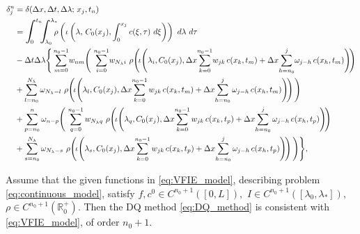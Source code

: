 \documentclass[10pt,a4paper]{amsart}
\begin{document}
\begin{equation}\label{eq:DQ_local_error}
    \allowdisplaybreaks
    \begin{split}
        \delta_j^n&=\delta(\Delta x, \Delta t, \Delta \lambda; \,  x_j,t_n) \\ 
        &=\displaystyle \scalebox{1.3}{$\displaystyle\int$}_{\!\!\!\!\! 0}^{t_n} \!\! \scalebox{1.3}{$\displaystyle\int$}_{\!\!\!\!\! \lambda_{0}}^{\lambda_{*}} \!\!\! \rho\left(\iota\left(\lambda,\, C_0(x_j), \int_0^{x_j}    c(\xi,\tau)  \ d\xi\right)\right) \ d\lambda \ d \tau \\
        &-\Delta t \Delta \lambda  \Bigg\{ \sum_{m=0}^{n_0-1} \! w_{n m} \Bigg( \, \sum_{i=0}^{n_0-1} \! w_{N_\lambda i} \ \rho \! \left( \! \iota \! \left(\lambda_i, C_0(x_j) , \Delta x \! \sum_{k=0}^{n_0-1} \! w_{jk} \, c(x_k,t_m)+\Delta x \! \sum_{h=n_0}^{j} \! \omega_{j-h} \, c(x_h,t_m) \right)\!\right) \\
        &+ \sum_{l=n_0}^{N_\lambda} \omega_{N_\lambda-l} \ \rho \! \left( \! \iota \! \left(\lambda_l, C_0(x_j) , \Delta x \! \sum_{k=0}^{n_0-1}w_{jk} \, c(x_k,t_m)+\Delta x \! \sum_{h=n_0}^{j}\omega_{j-h} \, c(x_h,t_m) \right)\!\right)\Bigg) \\
        &+ \sum_{p=n_0}^{n} \omega_{n-p} \Bigg( \, \sum_{q=0}^{n_0-1} w_{N_\lambda q} \ \rho \! \left( \! \iota \! \left(\lambda_q, C_0(x_j) , \Delta x \! \sum_{k=0}^{n_0-1}w_{jk} \, c(x_k,t_p)+\Delta x \! \sum_{h=n_0}^{j}\omega_{j-h} \, c(x_h,t_p) \right)\!\right) \\
        &+ \sum_{s=n_0}^{N_\lambda} \omega_{N_\lambda-s} \ \rho \! \left( \! \iota \! \left(\lambda_s, C_0(x_j) , \Delta x \! \sum_{k=0}^{n_0-1}w_{jk} \, c(x_k,t_p)+\Delta x \! \sum_{h=n_0}^{j}\omega_{j-h} \, c(x_h,t_p) \right)\!\right)\Bigg) \Bigg\}, 
    \end{split}
\end{equation}

\begin{lemma}\label{lemma:DQ_Cons}
    Assume that the given functions in \eqref{eq:VFIE_model}, describing problem \eqref{eq:continuous_model}, satisfy $f,c^0\in C^{n_0+1}([0,L]),$ $I\in C^{n_0+1}([\lambda_{0},\lambda_{*}]),$ $\rho\in C^{n_0+1}(\mathbb{R}^+_0).$ Then the DQ method \eqref{eq:DQ_method} is consistent with \eqref{eq:VFIE_model}, of order $n_0+1$. 
\end{lemma}
\end{document}
